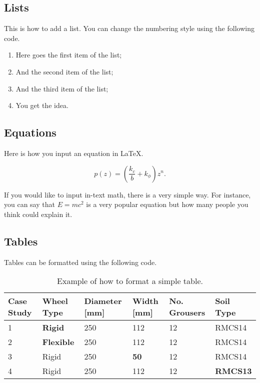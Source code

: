\subsection{Lists}
\label{subsec:lists}

This is how to add a list. You can change the numbering style using the following code. 

\renewcommand{\theenumi}{\roman{enumi}}
\begin{enumerate}
\item Here goes the first item of the list;
\item And the second item of the list; 
\item And the third item of the list;
\item You get the idea. 
\end{enumerate}

\subsection{Equations}
\label{subsec:eqs}

Here is how you input an equation in LaTeX. 

\begin{equation}\label{eqn:addref}
p(z) = \left( \frac{k_c}{b} + k_{\phi} \right) z^n.
\end{equation}

If you would like to input in-text math, there is a very simple way. For instance, you can say that $E=mc^2$ is a very popular equation but how many people you think could explain it.


\subsection{Tables}
\label{subsec:tables}

Tables can be formatted using the following code. 

\begin{table}[!hbt]
\begin{tabular}{p{1.5cm}p{1.8cm}p{2cm}p{1.7cm}p{1.7cm}p{2cm}}
\hline
Case Study & Wheel Type & Diameter [mm] & Width [mm] & No. Grousers & Soil Type \\
\hline
1 & \textbf{Rigid} & 250 & 112 & 12 & RMCS14 \\
2 & \textbf{Flexible} & 250 & 112 & 12 & RMCS14 \\
3 & Rigid & 250 & \textbf{50} & 12 & RMCS14 \\
4 & Rigid & 250 & 112 & 12 & \textbf{RMCS13} \\ 
\hline
\end{tabular}
\caption{Example of how to format a simple table.}
\label{table:cases}
\end{table}